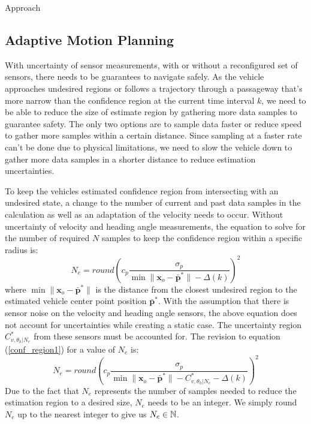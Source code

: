 \begin{section}{Approach}
\subsection{Adaptive Motion Planning}



With uncertainty of sensor measurements, with or without a reconfigured set of sensors, there needs to be guarantees to navigate safely. As the vehicle approaches undesired regions or follows a trajectory through a passageway that's more narrow than the confidence region at the current time interval $k$, we need to be able to reduce the size of estimate region by gathering more data samples to guarantee safety. The only two options are to sample data faster or reduce speed to gather more samples within a certain distance. Since sampling at a faster rate can't be done due to physical limitations, we need to slow the vehicle down to gather more data samples in a shorter distance to reduce estimation uncertainties.

To keep the vehicles estimated confidence region from intersecting with an undesired state, a change to the number of current and past data samples in the calculation as well as an adaptation of the velocity needs to occur. Without uncertainty of velocity and heading angle measurements, the equation to solve for the number of required $N$ samples to keep the confidence region within a specific radius is:
    \begin{equation}
    \label{conf_region1}
	    N_e = round \left(c_p \frac{ \sigma_p }{ {\min \lVert \bm{x}_o - \bar{\bm{p}}^* \rVert} -\Delta(k) } \right)^2
	\end{equation}
where $ \min \lVert {\bm{x}_o-\bar{\bm{p}}^*} \rVert$ is the distance from the closest undesired region to the estimated vehicle center point position $\bar{\bm{p}}^*$.
With the assumption that there is sensor noise on the velocity and heading angle sensors, the above equation does not account for uncertainties while creating a static case. The uncertainty region $C_{v,\theta_h|N_e}^{*}$ from these sensors must be accounted for. The revision to equation (\ref{conf_region1}) for a value of $N_e$ is:
    \begin{equation}
	    N_e = round \left(c_p \frac{ \sigma_p }{ {\min \lVert \bm{x}_o - \bar{\bm{p}}^* \rVert} -C_{v,\theta_h|N_e}^{*}-\Delta(k) } \right)^2
	\end{equation}
Due to the fact that $N_e$ represents the number of samples needed to reduce the estimation region to a desired size, $N_e$ needs to be an integer. We simply round $N_e$ up to the nearest integer to give us $N_e \in \mathbb{N}$.


\end{section}
